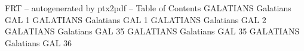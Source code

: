 \id FRT -- autogenerated by ptx2pdf --
\is Table of Contents
\tr {} GALATIANS Galatians GAL 1
\tr {} GALATIANS Galatians GAL 1
\tr {} GALATIANS Galatians GAL 2
\tr {} GALATIANS Galatians GAL 35
\tr {} GALATIANS Galatians GAL 35
\tr {} GALATIANS Galatians GAL 36
